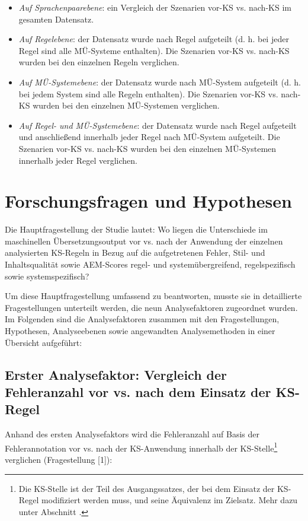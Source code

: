 \begin{itemize}
\item \textit{Auf Sprachenpaarebene}: ein Vergleich der Szenarien vor-KS vs. nach-KS im gesamten Datensatz.
\item \textit{Auf Regelebene}: der Datensatz wurde nach Regel aufgeteilt (d. h. bei jeder Regel sind alle MÜ-Systeme enthalten). Die Szenarien vor-KS vs. nach-KS wurden bei den einzelnen Regeln verglichen.
\item \textit{Auf MÜ-Systemebene}: der Datensatz wurde nach MÜ-System aufgeteilt (d. h. bei jedem System sind alle Regeln enthalten). Die Szenarien vor-KS vs. nach-KS wurden bei den einzelnen MÜ-Systemen verglichen.
\item \textit{Auf Regel- und MÜ-Systemebene}: der Datensatz wurde nach Regel aufgeteilt und anschließend innerhalb jeder Regel nach MÜ-System aufgeteilt. Die Szenarien vor-KS vs. nach-KS wurden bei den einzelnen MÜ-Systemen innerhalb jeder Regel verglichen.
\end{itemize}

\section{\label{Toc51705130}{}{{Forschungsfragen und Hypothesen}}}

Die Hauptfragestellung der Studie lautet: Wo liegen die Unterschiede im maschinellen Übersetzungsoutput vor vs. nach der Anwendung der einzelnen analysierten KS-Regeln in Bezug auf die aufgetretenen Fehler, Stil- und Inhaltsqualität sowie AEM-Scores regel- und systemübergreifend, regelspezifisch sowie systemspezifisch?  

Um diese Hauptfragestellung umfassend zu beantworten, musste sie in detaillierte Fragestellungen unterteilt werden, die neun Analysefaktoren zugeordnet wurden. Im Folgenden sind die Analysefaktoren zusammen mit den Fragestellungen, Hypothesen, Analyseebenen sowie angewandten Analysemethoden in einer Übersicht aufgeführt:

\subsection*{Erster Analysefaktor: Vergleich der Fehleranzahl vor vs. nach dem Einsatz der KS-Regel}

Anhand des ersten Analysefaktors wird die Fehleranzahl auf Basis der Fehlerannotation vor vs. nach der KS-Anwendung innerhalb der KS-Stelle\footnote{{{{Die KS-Stelle ist der Teil des Ausgangssatzes, der bei dem Einsatz der KS-Regel modifiziert werden muss, und seine Äquivalenz im Zielsatz. Mehr dazu unter Abschnitt .}}}} verglichen (Fragestellung [1]):

